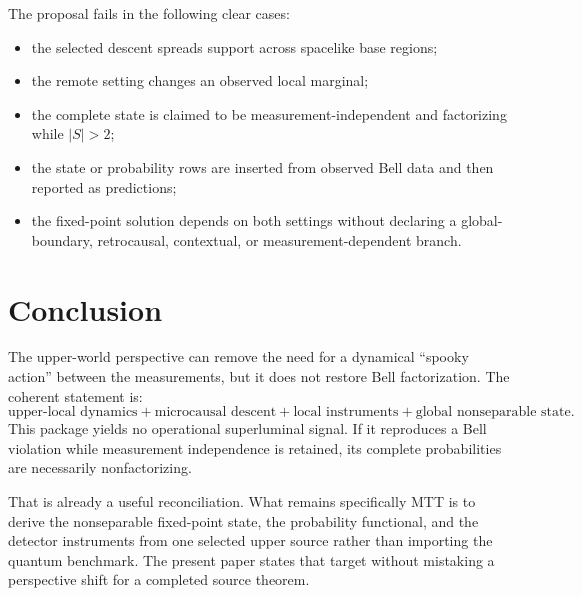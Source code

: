\documentclass[11pt]{article}
\theoremstyle{remark}
\begin{document}
The proposal fails in the following clear cases:

\begin{itemize}
\item the selected descent spreads support across spacelike base regions;
\item the remote setting changes an observed local marginal;
\item the complete state is claimed to be measurement-independent and
factorizing while $|S|>2$;
\item the state or probability rows are inserted from observed Bell data and
then reported as predictions;
\item the fixed-point solution depends on both settings without declaring a
global-boundary, retrocausal, contextual, or measurement-dependent branch.
\end{itemize}

\section{Conclusion}

The upper-world perspective can remove the need for a dynamical ``spooky
action'' between the measurements, but it does not restore Bell
factorization.  The coherent statement is:
\[
\boxed{
\text{upper-local dynamics}
+
\text{microcausal descent}
+
\text{local instruments}
+
\text{global nonseparable state}.
}
\]
This package yields no operational superluminal signal.  If it reproduces a
Bell violation while measurement independence is retained, its complete
probabilities are necessarily nonfactorizing.

That is already a useful reconciliation.  What remains specifically MTT is
to derive the nonseparable fixed-point state, the probability functional, and
the detector instruments from one selected upper source rather than importing
the quantum benchmark.  The present paper states that target without
mistaking a perspective shift for a completed source theorem.



\end{document}

